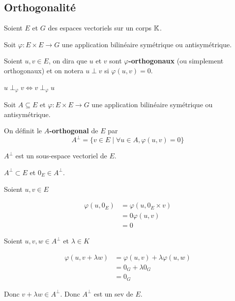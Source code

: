 \documentclass[a4paper,12pt]{article}
\begin{document}
\clearpage

\subsection{Orthogonalité}

\begin{definition}
    Soient $E$ et $G$ des espaces vectoriels sur un corps $\mathbb{K}$.

    Soit $\varphi: E \times E \to G$ une application bilinéaire symétrique ou antisymétrique.

    Soient $u, v \in E$, on dira que $u$ et $v$ sont \textbf{$\varphi$-orthogonaux} (ou simplement orthogonaux)
    et on notera $u \perp v$ si $\varphi(u, v) = 0$.
\end{definition}

\begin{proposition}{}{}
    $u \perp_\varphi v \iff v \perp_\varphi u$
\end{proposition}

\begin{definition}
    Soit $A \subseteq E$ et $\varphi: E \times E \to G$ une application bilinéaire symétrique ou antisymétrique.

    On définit le \textbf{$A$-orthogonal} de $E$ par
    $$
    A^\perp = \{ v \in E \mid \forall u \in A, \varphi(u, v) = 0 \}
    $$
\end{definition}

\begin{proposition}{}{}
    $A^\perp$ est un sous-espace vectoriel de $E$.
\end{proposition}

\begin{demonstration}
    $A^\perp \subset E$ et $0_E \in A^\perp$.

    Soient $u, v \in E$

    \begin{align*}
        \varphi(u, 0_E) &= \varphi(u, 0_E \times v) \\
        &= 0\varphi(u, v) \\
        &= 0
    \end{align*}

    Soient $u, v, w \in A^\perp$ et $\lambda \in K$

    \begin{align*}
        \varphi(u, v + \lambda w) &= \varphi(u, v) + \lambda \varphi(u, w) \\
        &= 0_G + \lambda 0_G \\
        &= 0_G
    \end{align*}

    Donc $v + \lambda w \in A^\perp$.
    Donc $A^\perp$ est un sev de $E$.
\end{demonstration}
\end{document}
